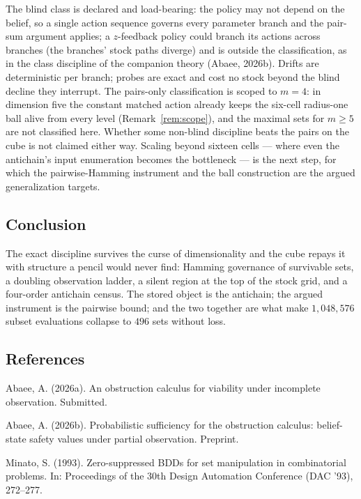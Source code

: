 \documentclass[10pt,twocolumn]{article}
\theoremstyle{plain}
\theoremstyle{definition}
\theoremstyle{remark}
\begin{document}
The blind class is declared and load-bearing: the policy may not
depend on the belief, so a single action sequence governs every
parameter branch and the pair-sum argument applies; a
\(z\)-feedback policy could branch its actions across branches (the
branches' stock paths diverge) and is outside the classification, as in the class discipline of the companion theory (Abaee, 2026b). Drifts are
deterministic per branch; probes are exact and cost no stock beyond
the blind decline they interrupt. The pairs-only classification is scoped to
\(m = 4\): in dimension five the constant matched action already
keeps the six-cell radius-one ball alive from every level
(Remark~\ref{rem:scope}), and the maximal sets for \(m \ge 5\) are
not classified here. Whether some non-blind discipline
beats the pairs on the cube is not claimed either way. Scaling beyond
sixteen cells --- where even the antichain's input enumeration becomes
the bottleneck --- is the next step, for which the pairwise-Hamming
instrument and the ball construction are the argued generalization
targets.

\subsection{Conclusion}\label{conclusion}

The exact discipline survives the curse of dimensionality and the
cube repays it with structure a pencil would never find: Hamming
governance of survivable sets, a doubling observation ladder, a
silent region at the top of the stock grid, and a four-order
antichain census. The stored object is the antichain; the argued
instrument is the pairwise bound; and the two together are what make
\(1{,}048{,}576\) subset evaluations collapse to \(496\) sets without
loss.

\subsection*{References}

{\footnotesize
Abaee, A. (2026a). An obstruction calculus for viability under incomplete observation. Submitted.

Abaee, A. (2026b). Probabilistic sufficiency for the obstruction calculus: belief-state safety values under partial observation. Preprint.

Minato, S. (1993). Zero-suppressed BDDs for set manipulation in combinatorial problems. In: Proceedings of the 30th Design Automation Conference (DAC '93), 272--277.


}
\end{document}
